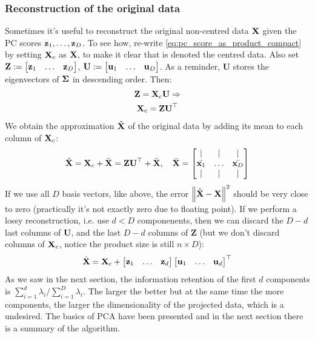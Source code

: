 \documentclass[a4paper]{article}
\begin{document}
\subsubsection{Reconstruction of the original data}
Sometimes it's useful to reconstruct the original non-centred data $\textbf{X}$ given the PC scores $\textbf{z}_1,\ldots,\textbf{z}_D$. To see how, re-write \eqref{eq:pc_score_as_product_compact} by setting $\textbf{X}_c$ as $\textbf{X}$, to make it clear that is denoted the centred data. Also set $\textbf{Z} := \begin{bmatrix} \textbf{z}_1 & \ldots & \textbf{z}_D\end{bmatrix}$, $\textbf{U} := \begin{bmatrix} \textbf{u}_1 & \ldots & \textbf{u}_D\end{bmatrix}$. As a reminder, $\textbf{U}$ stores the eigenvectors of $\boldsymbol{\Sigma}$ in descending order. Then:
\begin{gather}
    \textbf{Z} = \textbf{X}_c \textbf{U}\Rightarrow \nonumber \\
    \textbf{X}_c = \textbf{Z} \textbf{U}^{\top} \nonumber
\end{gather}
We obtain the approximation $\hat{\textbf{X}}$ of the original data by adding its mean to each column of $\textbf{X}_c$:
\begin{equation}
    \hat{\textbf{X}} = \textbf{X}_c + \bar{\textbf{X}} = \textbf{Z} \textbf{U}^{\top} + \bar{\textbf{X}}, \quad \bar{\textbf{X}} = 
    \begin{bmatrix}
    | & | & | \\
    \bar{\textbf{x}_1} & \ldots & \bar{\textbf{x}_D} \\
    | & | & |
    \end{bmatrix}
\end{equation}
If we use all $D$ basis vectors, like above, the error $\left\lVert\hat{\textbf{X}} - \textbf{X}\right\rVert^2$ should be very close to zero (practically it's not exactly zero due to floating point). If we perform a lossy reconstruction, i.e. use $d < D$ componenents, then we can discard the $D-d$ last columns of $\textbf{U}$, and the last $D-d$ columns of $\textbf{Z}$ (but we don't discard columns of $\textbf{X}_c$, notice the product size is still $n\times D$):
\begin{equation}
    \hat{\textbf{X}} = \textbf{X}_c + \begin{bmatrix}
    \textbf{z}_1 & \ldots & \textbf{z}_d
    \end{bmatrix}\begin{bmatrix}
    \textbf{u}_1 & \ldots & \textbf{u}_d
    \end{bmatrix}^{\top}
    \label{eq:recon_non_centred_data}
\end{equation}
As we saw in the next section, the information retention of the first $d$ components is $\sum\limits_{i=1}^d \lambda_i/\sum\limits_{i=1}^D \lambda_i$. The larger the better but at the same time the more components, the larger the dimensionality of the projected data, which is a undesired. The basics of PCA have been presented and in the next section there is a summary of the algorithm.
\end{document}
